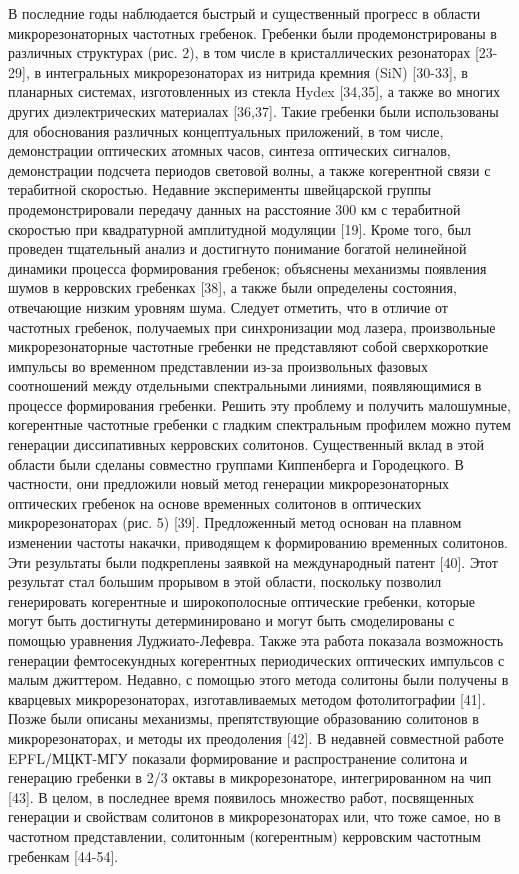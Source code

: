 В последние годы наблюдается быстрый и существенный прогресс в области микрорезонаторных частотных гребенок. Гребенки были продемонстрированы в различных структурах (рис. 2), в том числе в кристаллических резонаторах [23-29], в интегральных микрорезонаторах из нитрида кремния (SiN) [30-33], в планарных системах, изготовленных из стекла Hydex [34,35], а также во многих других диэлектрических материалах [36,37]. Такие гребенки были использованы для обоснования различных концептуальных приложений, в том числе, демонстрации оптических атомных часов, синтеза оптических сигналов, демонстрации подсчета периодов световой волны, а также когерентной связи с терабитной скоростью. Недавние эксперименты швейцарской группы продемонстрировали передачу данных на расстояние 300 км с терабитной скоростью при квадратурной амплитудной модуляции [19].
Кроме того, был проведен тщательный анализ и достигнуто понимание богатой нелинейной динамики процесса формирования гребенок; объяснены механизмы появления шумов в керровских гребенках [38], а также были определены состояния, отвечающие низким уровням шума. Следует отметить, что в отличие от частотных гребенок, получаемых при синхронизации мод лазера, произвольные микрорезонаторные частотные гребенки не представляют собой сверхкороткие импульсы во временном представлении из-за произвольных фазовых соотношений между отдельными спектральными линиями, появляющимися в процессе формирования гребенки. Решить эту проблему и получить малошумные, когерентные частотные гребенки с гладким спектральным профилем можно путем генерации диссипативных керровских солитонов. Существенный вклад в этой области были сделаны совместно группами Киппенберга и Городецкого. В частности, они предложили новый метод генерации микрорезонаторных оптических гребенок на основе временных солитонов в оптических микрорезонаторах (рис. 5) [39]. Предложенный метод основан на плавном изменении частоты накачки, приводящем к формированию временных солитонов. Эти результаты были подкреплены заявкой на международный патент [40]. Этот результат стал большим прорывом в этой области, поскольку позволил генерировать когерентные и широкополосные оптические гребенки, которые могут быть достигнуты детерминировано и могут быть смоделированы с помощью уравнения Луджиато-Лефевра. Также эта работа показала возможность генерации фемтосекундных когерентных периодических оптических импульсов с малым джиттером. Недавно, с помощью этого метода солитоны были получены в кварцевых микрорезонаторах, изготавливаемых методом фотолитографии [41]. Позже были описаны механизмы, препятствующие образованию солитонов в микрорезонаторах, и методы их преодоления [42]. В недавней совместной работе EPFL/МЦКТ-МГУ показали формирование и распространение солитона и генерацию гребенки в 2/3 октавы в микрорезонаторе, интегрированном на чип [43].  В целом, в последнее время появилось множество работ, посвященных генерации и свойствам солитонов в микрорезонаторах или, что тоже самое, но в частотном представлении, солитонным (когерентным) керровским частотным гребенкам [44-54].
